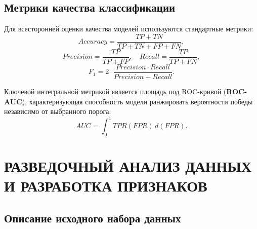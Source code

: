 \documentclass[14pt, a4paper]{extarticle}
\begin{document}
\subsection{Метрики качества классификации}

Для всесторонней оценки качества моделей используются стандартные метрики:
\begin{equation}
Accuracy = \frac{TP + TN}{TP + TN + FP + FN},
\end{equation}
\begin{equation}
Precision = \frac{TP}{TP + FP}, \quad Recall = \frac{TP}{TP + FN},
\end{equation}
\begin{equation}
F_1 = 2 \cdot \frac{Precision \cdot Recall}{Precision + Recall}.
\end{equation}

Ключевой интегральной метрикой является площадь под ROC-кривой (\textbf{ROC-AUC}), характеризующая способность модели ранжировать вероятности победы независимо от выбранного порога:
\begin{equation}
AUC = \int_{0}^{1} TPR(FPR) \, d(FPR).
\end{equation}

\newpage

\section{РАЗВЕДОЧНЫЙ АНАЛИЗ ДАННЫХ И РАЗРАБОТКА ПРИЗНАКОВ}

\subsection{Описание исходного набора данных}
\end{document}
